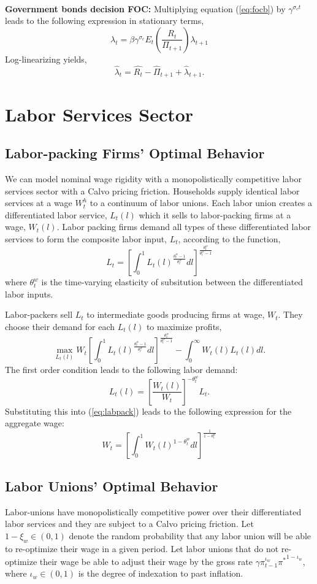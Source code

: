 \documentclass[11pt]{article}
\newcommand{\beq}{\begin{equation}}
\newcommand{\eeq}{\end{equation}}
\newcommand{\ds}{\displaystyle}
\newcommand{\eqref}[1]{(\ref{#1})}
\begin{document}
\ \\
\textbf{Government bonds decision FOC:} Multiplying equation \eqref{eq:focb} by $\gamma^{\sigma_c t}$ leads to the following expression in stationary terms,
\beq \label{eq:sfocb} \lambda_t = \beta \gamma^{\sigma_c} E_t \left(\frac{\ds R_t}{\ds \Pi_{t+1}}\right) \lambda_{t+1} \eeq
Log-linearizing yields,
\beq \label{eq:lnfocb} \hat{\lambda}_t = \hat{R_t} - \hat{\Pi}_{t+1} + \hat{\lambda}_{t+1}. \eeq

\section{Labor Services Sector}
\subsection{Labor-packing Firms' Optimal Behavior}
We can model nominal wage rigidity with a monopolistically competitive labor services sector with a Calvo pricing friction.  Households supply identical labor services at a wage $W_t^h$ to a continuum of labor unions.  Each labor union creates a differentiated labor service, $L_t(l)$ which it sells to labor-packing firms at a wage, $W_t(l)$.  Labor packing firms demand all types of these differentiated labor services to form the composite labor input, $L_t$, according to the function,
\beq \label{eq:labpack} L_t = \left[ \int_0^1 L_t(l)^{\frac{\theta_t^w-1}{\theta_t^w}} dl \right]^{\frac{\theta_t^w}{\theta_t^w-1}} \eeq
where $\theta_t^w$ is the time-varying elasticity of subsitution between the differentiated labor inputs. 

Labor-packers sell $L_t$ to intermediate goods producing firms at wage, $W_t$.  They choose their demand for each $L_t(l)$ to maximize profits,
\beq \max_{L_t(l)} W_t \left[ \int_0^1 L_t(l)^{\frac{\theta_t^w-1}{\theta_t^w}} dl \right]^{\frac{\theta_t^w}{\theta_t^w-1}}  - \int_0^\infty W_t(l) L_t(l) dl. \eeq
The first order condition leads to the following labor demand:
\beq L_t(l) = \left[ \frac{W_t(l)}{W_t} \right]^{-\theta_t^w} L_t. \eeq
Substituting this into \eqref{eq:labpack} leads to the following expression for the aggregate wage:
\beq \label{eq:agwage} W_t = \left[ \int_0^1 W_t(l)^{1-\theta_t^w} dl \right]^{\frac{1}{1-\theta_t^w}} \eeq

\subsection{Labor Unions' Optimal Behavior}
Labor-unions have monopolistically competitive power over their differentiated labor services and they are subject to a Calvo pricing friction.  Let $1-\xi_w \in (0,1)$ denote the random probability that any labor union will be able to re-optimize their wage in a given period.  Let labor unions that do not re-optimize their wage be able to adjust their wage by the gross rate $\gamma \pi_{t-1}^{\iota_w} {\pi^*}^{1-\iota_w}$, where $\iota_w \in (0,1)$ is the degree of indexation to past inflation.
\end{document}

